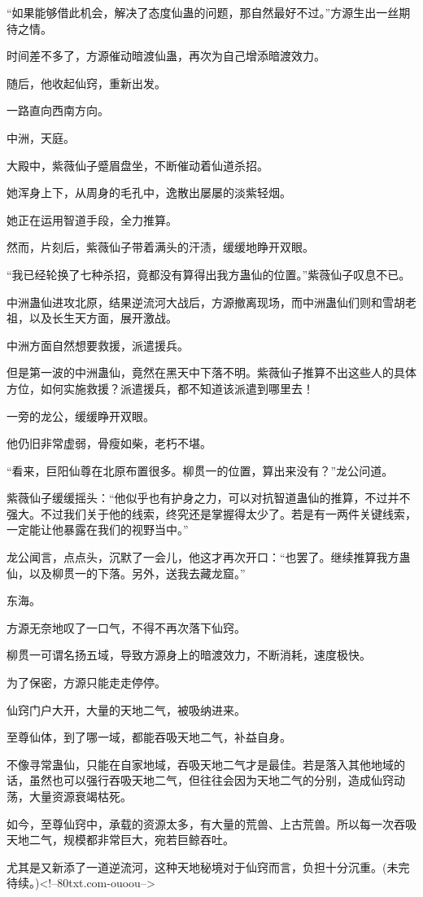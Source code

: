 \begin{this_body}
“如果能够借此机会，解决了态度仙蛊的问题，那自然最好不过。”方源生出一丝期待之情。

时间差不多了，方源催动暗渡仙蛊，再次为自己增添暗渡效力。

随后，他收起仙窍，重新出发。

一路直向西南方向。

中洲，天庭。

大殿中，紫薇仙子蹙眉盘坐，不断催动着仙道杀招。

她浑身上下，从周身的毛孔中，逸散出屡屡的淡紫轻烟。

她正在运用智道手段，全力推算。

然而，片刻后，紫薇仙子带着满头的汗渍，缓缓地睁开双眼。

“我已经轮换了七种杀招，竟都没有算得出我方蛊仙的位置。”紫薇仙子叹息不已。

中洲蛊仙进攻北原，结果逆流河大战后，方源撤离现场，而中洲蛊仙们则和雪胡老祖，以及长生天方面，展开激战。

中洲方面自然想要救援，派遣援兵。

但是第一波的中洲蛊仙，竟然在黑天中下落不明。紫薇仙子推算不出这些人的具体方位，如何实施救援？派遣援兵，都不知道该派遣到哪里去！

一旁的龙公，缓缓睁开双眼。

他仍旧非常虚弱，骨瘦如柴，老朽不堪。

“看来，巨阳仙尊在北原布置很多。柳贯一的位置，算出来没有？”龙公问道。

紫薇仙子缓缓摇头：“他似乎也有护身之力，可以对抗智道蛊仙的推算，不过并不强大。不过我们关于他的线索，终究还是掌握得太少了。若是有一两件关键线索，一定能让他暴露在我们的视野当中。”

龙公闻言，点点头，沉默了一会儿，他这才再次开口：“也罢了。继续推算我方蛊仙，以及柳贯一的下落。另外，送我去藏龙窟。”

东海。

方源无奈地叹了一口气，不得不再次落下仙窍。

柳贯一可谓名扬五域，导致方源身上的暗渡效力，不断消耗，速度极快。

为了保密，方源只能走走停停。

仙窍门户大开，大量的天地二气，被吸纳进来。

至尊仙体，到了哪一域，都能吞吸天地二气，补益自身。

不像寻常蛊仙，只能在自家地域，吞吸天地二气才是最佳。若是落入其他地域的话，虽然也可以强行吞吸天地二气，但往往会因为天地二气的分别，造成仙窍动荡，大量资源衰竭枯死。

如今，至尊仙窍中，承载的资源太多，有大量的荒兽、上古荒兽。所以每一次吞吸天地二气，规模都非常巨大，宛若巨鲸吞吐。

尤其是又新添了一道逆流河，这种天地秘境对于仙窍而言，负担十分沉重。(未完待续。)<!--80txt.com-ouoou-->

\end{this_body}

